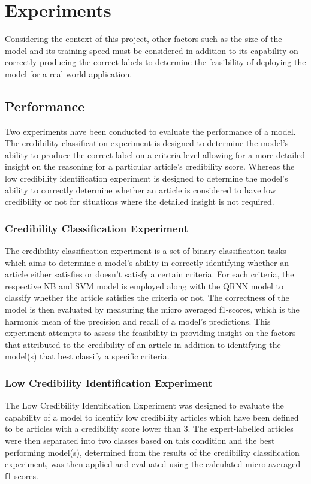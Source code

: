 \documentclass[a4paper,twoside,phd]{BYUPhys}
\begin{document}
\section{Experiments}
\label{sec:Experiments}

Considering the context of this project, other factors such as the size of the model and its training speed must be considered in addition to its capability on correctly producing the correct labels to determine the feasibility of deploying the model for a real-world application. 

\subsection{Performance}
\label{sec:PerformanceExperiments}

Two experiments have been conducted to evaluate the performance of a model. The credibility classification experiment is designed to determine the model's ability to produce the correct label on a criteria-level allowing for a more detailed insight on the reasoning for a particular article's credibility score. Whereas the low credibility identification experiment is designed to determine the model's ability to correctly determine whether an article is considered to have low credibility or not for situations where the detailed insight is not required.

\subsubsection{Credibility Classification Experiment}
\label{sec:CredibilityClassificationExperiment}
The credibility classification experiment is a set of binary classification tasks which aims to determine a model's ability in correctly identifying whether an article either satisfies or doesn't satisfy a certain criteria. 
For each criteria, the respective NB and SVM model is employed along with the QRNN model to classify whether the article satisfies the criteria or not. The correctness of the model is then evaluated by measuring the micro averaged f1-scores, which is the harmonic mean of the precision and recall of a model's predictions. This experiment attempts to assess the feasibility in providing insight on the factors that attributed to the credibility of an article in addition to identifying the model(s) that best classify a specific criteria.


\subsubsection{Low Credibility Identification Experiment}
\label{sec:LowCredibilityIdentification}
The Low Credibility Identification Experiment was designed to evaluate the capability of a model to identify low credibility articles which have been defined to be articles with a credibility score lower than 3. The expert-labelled articles were then separated into two  classes based on this condition and the best performing model(s), determined from the results of the credibility classification experiment, was then applied and evaluated using the calculated micro averaged f1-scores. 
\end{document}
